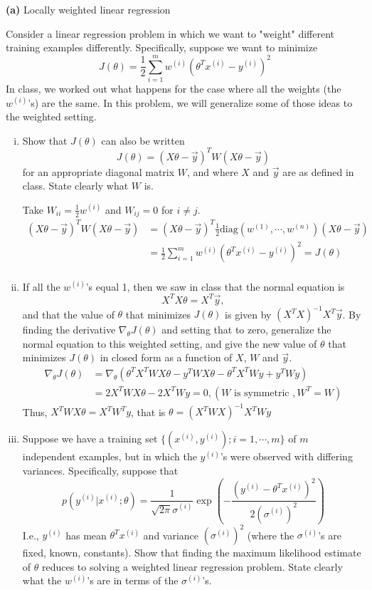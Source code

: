 \documentclass[11pt]{article}
\renewcommand\part[1]{\vspace{.10in}\textbf{(#1)  }}
\begin{document}
\part{a} Locally weighted linear regression

Consider a linear regression problem in which we want to "weight" different training examples differently. Specifically, suppose we want to minimize
$$J(\theta) = \frac{1}{2}\sum_{i=1}^{m}w^{(i)}\left(\theta^Tx^{(i)}-y^{(i)}\right)^2$$
In class, we worked out what happens for the case where all the weights (the $w^{(i)}$'s) are the
same. In this problem, we will generalize some of those ideas to the weighted setting.
\begin{enumerate}[i.]
  \item Show that $J(\theta)$ can also be written
$$J(\theta) = (X\theta-\overrightarrow{y})^TW(X\theta-\overrightarrow{y})$$
for an appropriate diagonal matrix $W$, and where $X$ and $\overrightarrow{y}$ are as defined in class. State clearly what $W$ is.

Take $W_{ii} = \frac{1}{2}w^{(i)}$ and $W_{ij} = 0$ for $i \neq j$.
\begin{align*}
  (X\theta-\overrightarrow{y})^TW(X\theta-\overrightarrow{y}) & =  (X\theta-\overrightarrow{y})^T\frac{1}{2}\text{diag}(w^{(1)}, \cdots, w^{(n)})(X\theta-\overrightarrow{y})\\
  ~ & = \frac{1}{2} \sum_{i=1}^{m}w^{(i)}\left(\theta^Tx^{(i)}-y^{(i)}\right)^2 = J(\theta)\\
\end{align*}
  \item If all the $w^{(i)}$'s equal 1, then we saw in class that the normal equation is
$$X^TX\theta = X^T\overrightarrow{y},$$
and that the value of $\theta$ that minimizes $J(\theta)$ is given by $(X^TX)^{-1}X^T\overrightarrow{y}$. By finding
the derivative $\nabla_\theta J(\theta)$ and setting that to zero, generalize the normal equation to this
weighted setting, and give the new value of $\theta$ that minimizes $J(\theta)$ in closed form as a function of $X$, $W$ and $\overrightarrow{y}$.
\begin{align*}
\nabla_\theta J(\theta) & = \nabla_\theta(\theta^TX^TWX\theta-y^TWX\theta-\theta^TX^TWy+y^TWy) \\
~ & = 2X^TWX\theta - 2X^TWy = 0,( W \text{ is symmetric }, W^T = W)
\end{align*}
Thus, $X^TWX\theta = X^TW^Ty$, that is $\theta = (X^TWX)^{-1}X^TWy$

  \item Suppose we have a training set $\{(x^{(i)}, y^{(i)}); i = 1, \cdots, m\}$ of $m$ independent examples, but in which the $y^{(i)}$'s were observed with differing variances. Specifically, suppose that
$$p(y^{(i)} | x^{(i)}; \theta) = \frac{1}{\sqrt{2\pi}\sigma^{(i)}}\exp\left(-\frac{(y^{(i)}-\theta^Tx^{(i)})^2}{2(\sigma^{(i)})^2}\right)$$
I.e., $y^{(i)}$ has mean $\theta^Tx^{(i)}$ and variance $(\sigma^{(i)})^2$ (where the $\sigma^{(i)}$'s are fixed, known, constants). Show that finding the maximum likelihood estimate of $\theta$ reduces to solving a weighted linear regression problem. State clearly what the $w^{(i)}$'s are in terms of the $\sigma^{(i)}$'s.


\end{enumerate}
\end{document}

